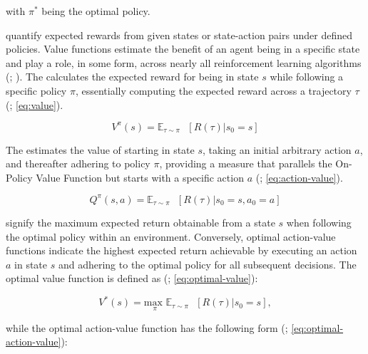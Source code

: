 \noindent with $\pi^*$ being the optimal policy.

\bigskip

\noindent {} quantify expected rewards from given states or state-action pairs under defined policies. Value functions estimate the benefit of an agent being in a specific state and play a role, in some form, across nearly all reinforcement learning algorithms (\textcolor{deepblue}{\cite{SpinningUp2018}; \cite{AlMahamid_2021}}). The  calculates the expected reward for being in state $s$ while following a specific policy $\pi$, essentially computing the expected reward across a trajectory $\tau$ (\textcolor{deepblue}{\cite{Sutton1998}; \autoref{eq:value}}).

\begin{equation}
    V^{\pi}(s) = \mathbb{E}_{\tau \sim \pi} \text{ }[R(\tau) | s_0 = s]
    \label{eq:value}
\end{equation}

\noindent The  estimates the value of starting in state $s$, taking an initial arbitrary action $a$, and thereafter adhering to policy $\pi$, providing a measure that parallels the On-Policy Value Function but starts with a specific action $a$ (\textcolor{deepblue}{\cite{Sutton1998}; \autoref{eq:action-value}}).

\begin{equation}
    Q^{\pi}(s, a) = \mathbb{E}_{\tau \sim \pi} \text{ }[R(\tau) | s_0 = s, a_0 = a]
    \label{eq:action-value}
\end{equation}

\noindent {} signify the maximum expected return obtainable from a state $s$ when following the optimal policy within an environment. Conversely, optimal action-value functions indicate the highest expected return achievable by executing an action $a$ in state $s$ and adhering to the optimal policy for all subsequent decisions. The optimal value function is defined as (\textcolor{deepblue}{\cite{Sutton1998}; \autoref{eq:optimal-value}}):

\begin{equation}
    V^{*}(s) = \underset{\pi}{\text{max }} \mathbb{E}_{\tau \sim \pi} \text{ }[R(\tau) | s_0 = s],
    \label{eq:optimal-value}
\end{equation}

\noindent while the optimal action-value function has the following form (\textcolor{deepblue}{\cite{Sutton1998}; \autoref{eq:optimal-action-value}}):

